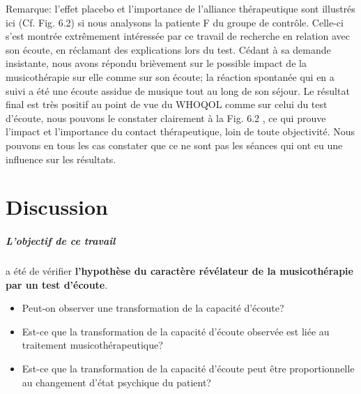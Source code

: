   
Remarque:  l'effet placebo et l'importance de  
l'alliance 
thérapeutique sont  illustrés ici (Cf. Fig. 6.2) si nous analysons 
la patiente F du groupe de contrôle. 
Celle-ci s'est  montrée extrêmement intéressée par ce travail de recherche en relation avec son écoute, 
en réclamant des explications 
lors du test. 
Cédant à sa demande insistante, nous avons répondu brièvement 
sur le possible impact de la musicothérapie  sur elle comme sur son écoute; la réaction spontanée qui en 
a suivi 
a été une écoute assidue de musique  tout au 
long de son séjour. Le résultat final est très positif au point de vue du WHOQOL comme sur celui du test 
d'écoute, nous pouvons le constater clairement  à la 
Fig. 6.2 , ce qui  
prouve  l'impact et l'importance du contact thérapeutique, loin de toute objectivité.
Nous pouvons en tous les cas constater que ce ne sont pas les séances qui ont eu une influence sur les 
résultats.
  
  
  
 
\chapter{Discussion}
\label{Conclusions}



 
\paragraph{L'objectif de ce travail} a été de vérifier\textbf{ l'hypothèse du caractère
	révélateur de la musicothérapie par un  test
	d'écoute}. %
	


 


\begin{itemize}
	
	\item Peut-on observer une transformation de la capacité d'écoute?
	\item Est-ce que la transformation de la capacité d'écoute observée est liée
	au traitement musicothérapeutique?
	\item Est-ce que la transformation de la capacité d'écoute peut être proportionnelle au 
	changement d'état psychique du patient?
\end{itemize}


